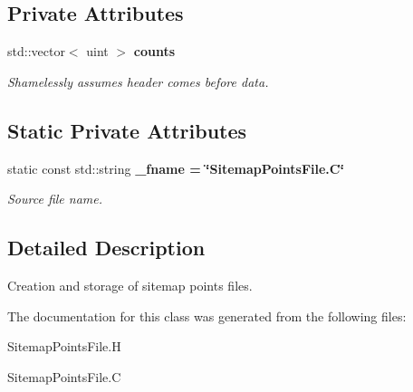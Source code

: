 \subsection*{Private Attributes}
\begin{CompactItemize}
\item 
std::vector$<$ uint $>$ \bf{counts}\label{classASCbase_1_1SitemapPointsFile_b3c2f62fc9252fb70d4287d889c7b9fa}

\begin{CompactList}\small\item\em Shamelessly assumes header comes before data. \item\end{CompactList}\end{CompactItemize}
\subsection*{Static Private Attributes}
\begin{CompactItemize}
\item 
static const std::string \bf{\_\-fname} = \char`\"{}Sitemap\-Points\-File.C\char`\"{}\label{classASCbase_1_1SitemapPointsFile_3c2df5c3e3de9995d61644c28d181c42}

\begin{CompactList}\small\item\em Source file name. \item\end{CompactList}\end{CompactItemize}


\subsection{Detailed Description}
Creation and storage of sitemap points files. 



The documentation for this class was generated from the following files:\begin{CompactItemize}
\item 
Sitemap\-Points\-File.H\item 
Sitemap\-Points\-File.C\end{CompactItemize}
